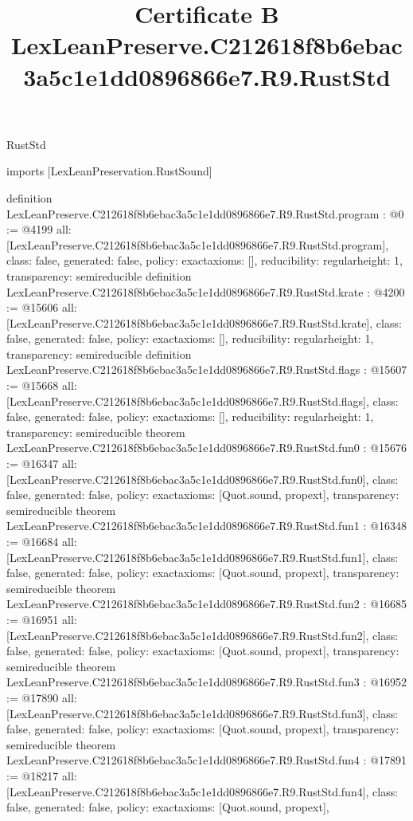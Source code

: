 \begin{lexlean}{RustStd}
\title{Certificate B LexLeanPreserve.C212618f8b6ebac3a5c1e1dd0896866e7.R9.RustStd}
\begin{coremodule}
imports [LexLeanPreservation.RustSound]

definition LexLeanPreserve.C212618f8b6ebac3a5c1e1dd0896866e7.R9.RustStd.program : @0 := @4199 {
  all: [LexLeanPreserve.C212618f8b6ebac3a5c1e1dd0896866e7.R9.RustStd.program],
  class: false,
  generated: false,
  policy: exact{axioms: []},
  reducibility: regular{height: 1},
  transparency: semireducible
}
definition LexLeanPreserve.C212618f8b6ebac3a5c1e1dd0896866e7.R9.RustStd.krate : @4200 := @15606 {
  all: [LexLeanPreserve.C212618f8b6ebac3a5c1e1dd0896866e7.R9.RustStd.krate],
  class: false,
  generated: false,
  policy: exact{axioms: []},
  reducibility: regular{height: 1},
  transparency: semireducible
}
definition LexLeanPreserve.C212618f8b6ebac3a5c1e1dd0896866e7.R9.RustStd.flags : @15607 := @15668 {
  all: [LexLeanPreserve.C212618f8b6ebac3a5c1e1dd0896866e7.R9.RustStd.flags],
  class: false,
  generated: false,
  policy: exact{axioms: []},
  reducibility: regular{height: 1},
  transparency: semireducible
}
theorem LexLeanPreserve.C212618f8b6ebac3a5c1e1dd0896866e7.R9.RustStd.fun0 : @15676 := @16347 {
  all: [LexLeanPreserve.C212618f8b6ebac3a5c1e1dd0896866e7.R9.RustStd.fun0],
  class: false,
  generated: false,
  policy: exact{axioms: [Quot.sound, propext]},
  transparency: semireducible
}
theorem LexLeanPreserve.C212618f8b6ebac3a5c1e1dd0896866e7.R9.RustStd.fun1 : @16348 := @16684 {
  all: [LexLeanPreserve.C212618f8b6ebac3a5c1e1dd0896866e7.R9.RustStd.fun1],
  class: false,
  generated: false,
  policy: exact{axioms: [Quot.sound, propext]},
  transparency: semireducible
}
theorem LexLeanPreserve.C212618f8b6ebac3a5c1e1dd0896866e7.R9.RustStd.fun2 : @16685 := @16951 {
  all: [LexLeanPreserve.C212618f8b6ebac3a5c1e1dd0896866e7.R9.RustStd.fun2],
  class: false,
  generated: false,
  policy: exact{axioms: [Quot.sound, propext]},
  transparency: semireducible
}
theorem LexLeanPreserve.C212618f8b6ebac3a5c1e1dd0896866e7.R9.RustStd.fun3 : @16952 := @17890 {
  all: [LexLeanPreserve.C212618f8b6ebac3a5c1e1dd0896866e7.R9.RustStd.fun3],
  class: false,
  generated: false,
  policy: exact{axioms: [Quot.sound, propext]},
  transparency: semireducible
}
theorem LexLeanPreserve.C212618f8b6ebac3a5c1e1dd0896866e7.R9.RustStd.fun4 : @17891 := @18217 {
  all: [LexLeanPreserve.C212618f8b6ebac3a5c1e1dd0896866e7.R9.RustStd.fun4],
  class: false,
  generated: false,
  policy: exact{axioms: [Quot.sound, propext]},
}
\end{coremodule}
\end{lexlean}
